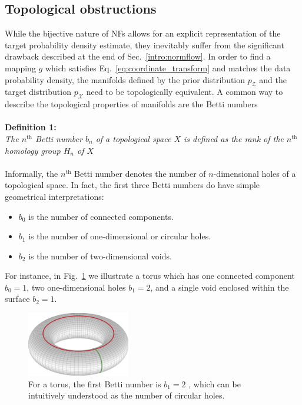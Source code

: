 \subsection{Topological obstructions}
\label{sec:topology}

While the bijective nature of NFs allows for an explicit representation of the target probability density estimate, they inevitably suffer from the significant drawback described at the end of Sec.~\ref{intro:normflow}.
In order to find a mapping $g$ which satisfies Eq.~\eqref{eq:coordinate_transform} and matches the data probability density, the manifolds defined by the prior distribution $p_\mathcal{Z}$ and the target distribution $p_\mathcal{X}$ need to be topologically equivalent.
A common way to describe the topological properties of manifolds are the Betti numbers\\
%
\\
\textbf{Definition 1:}\\
\textit{The $n^\text{th}$ Betti number $b_n$ of a topological space $X$ is defined as the rank of the $n^\text{th}$ homology group $H_n$ of $X$~\cite{bettinumbers,hatcher2002algebraic}}\\\\
%
Informally, the $n^\text{th}$ Betti number denotes the number of $n$-dimensional holes of a topological space.
In fact, the first three Betti numbers do have simple geometrical interpretations:
\begin{itemize}
    \item $b_0$ is the number of connected components.
    \item $b_1$ is the number of one-dimensional or circular holes.
    \item $b_2$ is the number of two-dimensional voids.
\end{itemize}
For instance, in Fig.~\ref{fig:betti_torus} we illustrate a torus which has one connected component $b_0 =1$, two one-dimensional holes $b_1 = 2$, and a single void enclosed within the surface $b_2 = 1$.
%
\begin{figure}[!htbp]
    \centering
    \includegraphics[width=0.4\textwidth]{./figures/LSR/torus.png}
    \caption{For a torus, the first Betti number is $b_1 = 2$ , which can be intuitively understood as the number of circular holes.}
    \label{fig:betti_torus}
\end{figure}

